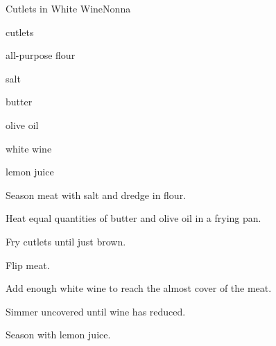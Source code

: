 \begin{recipe}{Cutlets in White Wine}{Nonna}{}

\begin{ingredients}
\item cutlets
\item all-purpose flour
\item salt
\item butter
\item olive oil
\item white wine
\item lemon juice
\end{ingredients}

\begin{directions}
\item Season meat with salt and dredge in flour.
\item Heat equal quantities of butter and olive oil in a frying pan.
\item Fry cutlets until just brown.
\item Flip meat.
\item Add enough white wine to reach the almost cover of the meat.
\item Simmer uncovered until wine has reduced.
\item Season with lemon juice.
\end{directions}

\end{recipe}
